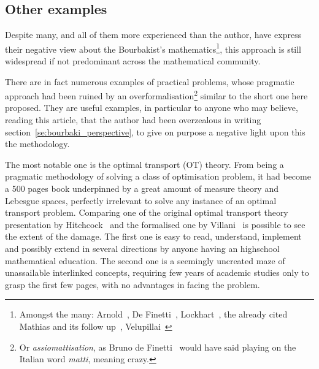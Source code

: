 \documentclass[]{scrartcl}
\theoremstyle{definition}
\begin{document}
\subsection*{Other examples}

Despite many, and all of them more experienced than the author, have express their negative view about the Bourbakist's mathematics\footnote{
    Amongst the many: Arnold~\cite{arnol1998teaching}, De Finetti~\cite{de2008bruno}, Lockhart~\cite{lockhart2009mathematician}, the already cited Mathias and its follow up~\cite{mathias1998further}, Velupillai~\cite{velupillai2012bourbaki}
}, this approach is still widespread if not predominant across the mathematical community. 

There are in fact numerous examples of practical problems, whose pragmatic approach had been ruined by an overformalisation\footnote{
    Or \emph{assiomattisation}, as Bruno de Finetti~\cite{de2008bruno} would have said playing on the Italian word \emph{matti}, meaning crazy.
} similar to the short one here proposed. They are useful examples, in particular to anyone who may believe, reading this article, that the author had been overzealous in writing section~\ref{se:bourbaki_perspective}, to give on purpose a negative light upon this the methodology.

The most notable one is the optimal transport (OT) theory. From being a pragmatic methodology of solving a class of optimisation problem, it had become a 500 pages book underpinned by a great amount of measure theory and Lebesgue spaces, perfectly irrelevant to solve any instance of an optimal transport problem. Comparing one of the original optimal transport theory presentation by Hitchcock~\cite{hitchcock1941distribution} and the formalised one by Villani~\cite{villani2003topics} is possible to see the extent of the damage. The first one is easy to read, understand, implement and possibly extend in several directions by anyone having an highschool mathematical education. The second one is a seemingly uncreated maze of unassailable interlinked concepts, requiring few years of academic studies only to grasp the first few pages, with no advantages in facing the problem. %
\end{document}
